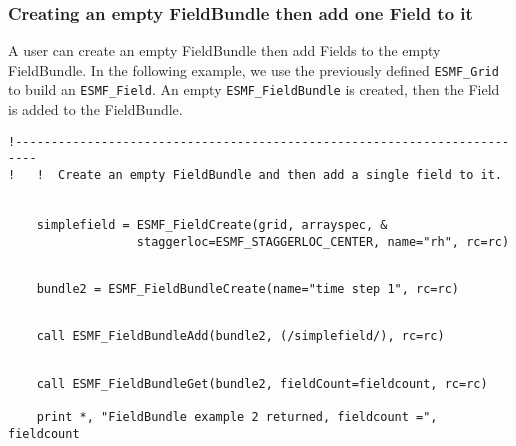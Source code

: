 
   \subsubsection{Creating an empty FieldBundle then add one Field to it}
   \label{sec:fieldbundle:usage:create_empty}
   A user can create an empty FieldBundle then add Fields to the empty FieldBundle.
   In the following example, we use the previously defined {\tt ESMF\_Grid}
   to build an {\tt ESMF\_Field}.
   An empty {\tt ESMF\_FieldBundle} is created, then the Field is added
   to the FieldBundle. 

 \begin{verbatim}
!-------------------------------------------------------------------------
!   !  Create an empty FieldBundle and then add a single field to it.


    simplefield = ESMF_FieldCreate(grid, arrayspec, &
                  staggerloc=ESMF_STAGGERLOC_CENTER, name="rh", rc=rc)
 
\end{verbatim}
 

 \begin{verbatim}
    bundle2 = ESMF_FieldBundleCreate(name="time step 1", rc=rc)
 
\end{verbatim}
 

 \begin{verbatim}
    call ESMF_FieldBundleAdd(bundle2, (/simplefield/), rc=rc)
 
\end{verbatim}
 

 \begin{verbatim}
    call ESMF_FieldBundleGet(bundle2, fieldCount=fieldcount, rc=rc)

    print *, "FieldBundle example 2 returned, fieldcount =", fieldcount
 
\end{verbatim}
 

